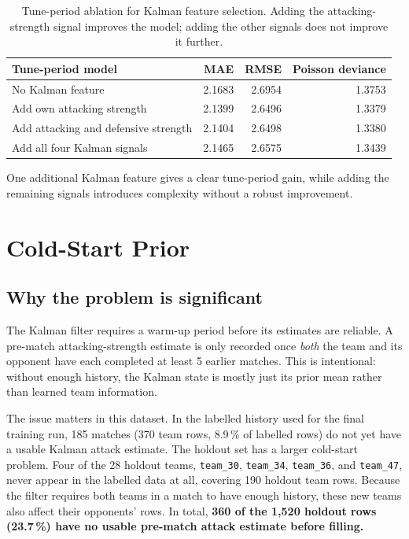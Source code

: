 \documentclass[11pt]{article}
\begin{document}
\begin{table}[h]
\centering
\begin{tabular}{lrrr}
\toprule
Tune-period model & MAE & RMSE & Poisson deviance \\
\midrule
No Kalman feature & 2.1683 & 2.6954 & 1.3753 \\
Add own attacking strength & 2.1399 & 2.6496 & 1.3379 \\
Add attacking and defensive strength & 2.1404 & 2.6498 & 1.3380 \\
Add all four Kalman signals & 2.1465 & 2.6575 & 1.3439 \\
\bottomrule
\end{tabular}
\caption{Tune-period ablation for Kalman feature selection. Adding the
attacking-strength signal improves the model; adding the other signals does
not improve it further.}
\end{table}

One additional Kalman feature gives a clear tune-period gain, while adding the
remaining signals introduces complexity without a robust improvement.

\section{Cold-Start Prior}

\subsection{Why the problem is significant}

The Kalman filter requires a warm-up period before its estimates are reliable.
A pre-match attacking-strength estimate is only recorded once \emph{both} the
team and its opponent have each completed at least 5 earlier matches. This is
intentional: without enough history, the Kalman state is mostly just its prior
mean rather than learned team information.

The issue matters in this dataset. In the labelled history used for the final
training run, 185 matches (370 team rows, 8.9\,\% of labelled rows) do not yet
have a usable Kalman attack estimate. The holdout set has a larger cold-start
problem. Four of the 28 holdout teams, \texttt{team\_30}, \texttt{team\_34},
\texttt{team\_36}, and \texttt{team\_47}, never appear in the labelled data at
all, covering 190 holdout team rows. Because the filter requires both teams in
a match to have enough history, these new teams also affect their opponents'
rows. In total, \textbf{360 of the 1{,}520 holdout rows (23.7\,\%) have no
usable pre-match attack estimate before filling.}
\end{document}

